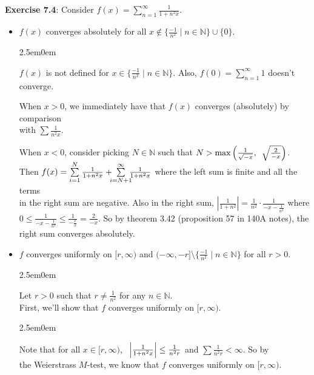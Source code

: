 \documentclass{book}
\newcommand{\pracTwo}{
   \color{Orange}%
   \fontsize{12}{14}\selectfont%
}
\newenvironment{myIndent}{%
   \begin{adjustwidth}{2.5em}{0em}%
}{%
   \end{adjustwidth}%
}
\newcommand{\myHS}{ \hspace{0.5em}}
\newcommand{\retTwo}{\hfill\bigbreak}
\begin{document}
\textbf{Exercise 7.4}: Consider $f(x) = \sum\limits_{n=1}^\infty \frac{1}{1+n^2x}$.
\begin{itemize}
   \item $f(x)$ converges absolutely for all $x \notin \{\frac{-1}{n^2} \mid n \in \mathbb{N}\} \cup \{0\}$.\\ [-9pt]
   
   {\begin{myIndent}\pracTwo
      $f(x)$ is not defined for $x \in \{\frac{-1}{n^2} \mid n \in \mathbb{N}\}$. Also, $f(0) = \sum\limits_{n=1}^\infty 1$ doesn't converge.\retTwo
   
      When $x > 0$, we immediately have that $f(x)$ converges (absolutely) by comparison\\ [6pt] with $\sum \frac{1}{n^2x}$.\retTwo
   
      When $x < 0$, consider picking $N \in \mathbb{N}$ such that $N > \max\left(\frac{1}{\sqrt{-x}},\myHS \sqrt{\frac{2}{-x}}\right)$.\\ [-7pt] Then $f(x) = \sum\limits_{i=1}^N \frac{1}{1 +n^2x} + \hspace{-0.5em}\sum\limits_{i=N+1}^\infty\hspace{-0.5em} \frac{1}{1 + n^2x}$ where the left sum is finite and all the terms\\ in the right sum are negative. Also in the right sum, $\left|\frac{1}{1 + n^2}\right| = \frac{1}{n^2}\cdot \frac{1}{-x - \frac{1}{n^2}}$ where\\ $0 \leq \frac{1}{-x - \frac{1}{n^2}} \leq \frac{1}{-\frac{x}{2}} = \frac{2}{-x}$. So by theorem 3.42 (proposition 57 in 140A notes), the\\ right sum converges absolutely.\retTwo
   \end{myIndent}}

   \item $f$ converges uniformly on $[r, \infty)$ and $(-\infty, -r]\setminus \{\frac{-1}{n^2} \mid n \in \mathbb{N}\}$ for all $r > 0$.\\ [-9pt]
   
   {\begin{myIndent}\pracTwo
      Let $r > 0$ such that $r \neq \frac{1}{n^2}$ for any $n \in \mathbb{N}$.\\
      First, we'll show that $f$ converges uniformly on $[r, \infty)$.
      \begin{myIndent}
         Note that for all $x \in [r, \infty)$, $\myHS\left|\frac{1}{1 + n^2x}\right| \leq \frac{1}{n^2r}$ and $\sum\frac{1}{n^2r} < \infty$. So by\\ the Weierstrass $M$-test, we know that $f$ converges uniformly on $[r, \infty)$.\retTwo
      \end{myIndent}


\end{myIndent}}
\end{itemize}
\end{document}
